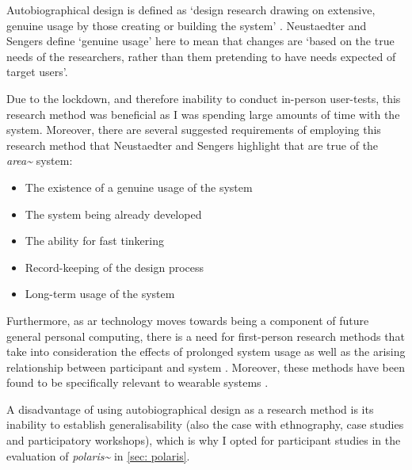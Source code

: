 Autobiographical design is defined as `design research drawing on extensive, genuine usage by those creating or building the system' \citep{neustaedter2012}. Neustaedter and Sengers define `genuine usage' here to mean that changes are `based on the true needs of the researchers, rather than them pretending to have needs expected of target users'.

Due to the lockdown, and therefore inability to conduct in-person user-tests, this research method was beneficial as I was spending large amounts of time with the system. Moreover, there are several suggested requirements of employing this research method that Neustaedter and Sengers highlight that are true of the \textit{area\textasciitilde{}} system:
\begin{itemize}
    \item The existence of a genuine usage of the system
    \item The system being already developed
    \item The ability for fast tinkering 
    \item Record-keeping of the design process
    \item Long-term usage of the system
\end{itemize}
Furthermore, as \ac{ar} technology moves towards being a component of future general personal computing, there is a need for first-person research methods that take into consideration the effects of prolonged system usage as well as the arising relationship between participant and system \citep{desjardins2018}. Moreover, these methods have been found to be specifically relevant to wearable systems \citep{cecchinato2017}.

A disadvantage of using autobiographical design as a research method is its inability to establish generalisability (also the case with ethnography, case studies and participatory workshops), which is why I opted for participant studies in the evaluation of \textit{polaris\textasciitilde{}} in \autoref{sec: polaris}.

